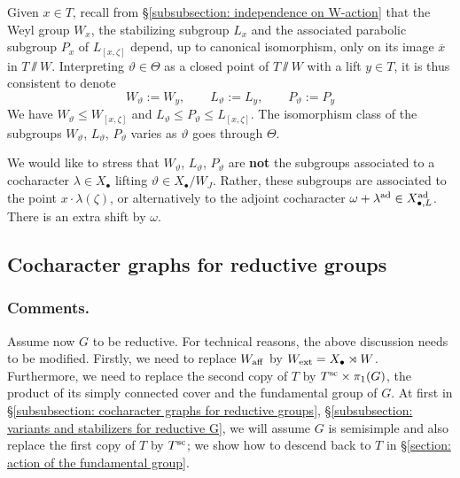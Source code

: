 \begin{notation}\label{notation: levi and paraolic subgroups labeled by elements of Theta}
Given $x\in T$, recall from \S \ref{subsubsection: independence on W-action} that the Weyl group $W_x$, the stabilizing subgroup $L_x$ and the associated parabolic subgroup $P_x$ of $L_{[x, \zeta]}$ depend, up to canonical isomorphism, only on its image $\overline{x}$ in $T \sslash W$.
%
Interpreting $\vartheta \in \Theta$ as a closed point of $T \sslash W$ with a lift $y \in T$, it is thus consistent to denote
\begin{equation*}
    W_{\vartheta} := W_{y} , \qquad
    L_{\vartheta} := L_{y} , \qquad
    P_{\vartheta} := P_{y} 
\end{equation*}
We have $W_{\vartheta} \leq W_{[x, \zeta]}$ and $L_{\vartheta} \leq P_{\vartheta}  \leq L_{[x, \zeta]}$. The isomorphism class of the subgroups $W_{\vartheta}$, $L_{\vartheta}$, $P_{\vartheta}$ varies as $\vartheta$ goes through $\Theta$.

We would like to stress that $W_{\vartheta}$, $L_{\vartheta}$, $P_{\vartheta}$ are \textbf{not} the subgroups associated to a cocharacter $\lambda \in X_{\bullet}$ lifting $\vartheta \in X_{\bullet}/W_J$. Rather, these subgroups are associated to the point $x \cdot \lambda(\zeta)$, or alternatively to the adjoint cocharacter $\omega + \lambda^{\ad} \in X^{\ad}_{\bullet, L}$. There is an extra shift by $\omega$.
\end{notation}




\subsection{Cocharacter graphs for reductive groups}\label{section: cocharacter graphs for reductive groups}

\subsubsection{Comments.}
Assume now $G$ to be reductive. For technical reasons, the above discussion needs to be modified. Firstly, we need to replace $W_{\aff}$ by $W_{\ext} = X_{\bullet} \rtimes W$. Furthermore, we need to replace the second copy of $T$ by $T^{\sc} \times \pi_1(G)$, the product of its simply connected cover and the fundamental group of $G$. At first in \S \ref{subsubsection: cocharacter graphs for reductive groups}, \S \ref{subsubsection: variants and stabilizers for reductive G}, we will assume $G$ is semisimple and also replace the first copy of $T$ by $T^{\sc}$; we show how to descend back to $T$ in \S \ref{section: action of the fundamental group}.

